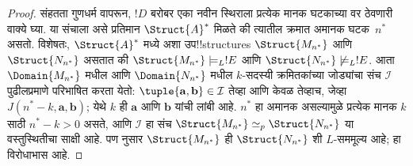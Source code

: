 \documentclass[../../../include/open-logic-section]{subfiles}
\begin{document}
\begin{proof}
संहतता गुणधर्म वापरून, $!D$ बरोबर एका नवीन स्थिराला प्रत्येक मानक
घटकाच्या वर ठेवणारी वाक्ये घ्या. या संचाला असे प्रतिमान $\Struct{A}^*$
मिळते की त्यातील क्रमात अमानक घटक~$n^*$ असतो. विशेषतः,
$\Struct{A}^*$ मध्ये अशा उप!!{structure}s $\Struct{M_{n^*}}$ आणि
$\Struct{N_{n^*}}$ असतात की $\Struct{M_{n^*}} \models_L !E$ आणि
$\Struct{N_{n^*}} \not\models_L !E$. आता $\Domain{M_{n^*}}$ मधील
आणि $\Domain{N_{n^*}}$ मधील $k$-सदस्यी क्रमितकांच्या जोड्यांचा संच
$\mathcal{I}$ पुढीलप्रमाणे परिभाषित करता येतो: $\tuple{\mathbf{a},
\mathbf{b}} \in \mathcal{I}$ तेव्हा आणि केवळ तेव्हाच, जेव्हा
$J(n^*-k, \mathbf{a}, \mathbf{b})$; येथे $k$ ही $\mathbf{a}$ आणि
$\mathbf{b}$ यांची लांबी आहे. $n^*$ हा अमानक असल्यामुळे प्रत्येक मानक
$k$ साठी $n^* - k >0$ असते, आणि $\mathcal{I}$ हा संच
$\Struct{M_{n^*}} \simeq_p \Struct{N_{n^*}}$ या वस्तुस्थितीचा साक्षी
आहे. पण  नुसार $\Struct{M_{n^*}}$ ही
$\Struct{N_{n^*}}$ शी $L$-सममूल्य आहे; हा विरोधाभास आहे.
\end{proof}
\end{document}
